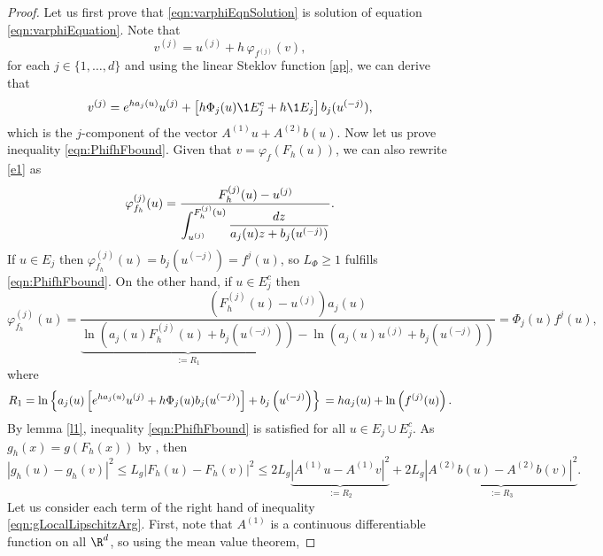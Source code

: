 \begin{proof}
Let us first prove that \eqref{eqn:varphiEqnSolution} is solution 
of equation \eqref{eqn:varphiEquation}.  Note that 
\begin{equation}\label{e1}
v^{(j)} = u^{(j)} + h \,\varphi_{f^{(j)}}(v),	
\end{equation}
for each $j\in \{1,\dots, d\}$ and using the linear Steklov function \eqref{ap}, 
we can derive that
\begin{equation}\label{r1}
v^{(j)}= e^{h a_j(u)} u^{(j)} + 
\left[
h\Phi_j(u)
\1{E_j^c}
+h \1{E_j}
\right]b_{j}(u^{(-j)}),
\end{equation}	
which is the $j$-component of the vector
$A^{(1)}u +A^{(2)} b(u)$. Now let us prove inequality \eqref{eqn:PhifhFbound}. Given that 
$v =\varphi_{f}(F_h(u))$, 
we can also rewrite \eqref{e1} as
$$
\varphi_{f_h}^{(j)}(u) = 
\frac{
	F_h^{(j)}(u)-u^{(j)}
}%
{%
	\displaystyle
	\int_{u^{(j)}}^{F_h^{(j)}(u)}
	\frac{dz}{a_j(u)z + b_j(u^{(-j)})}
}.
$$
If $u\in E_j$ then $\varphi_{f_h}^{(j)}(u) = b_j(u^{(-j)}) = f^{j}(u)$,
so $L_{\Phi}\geq 1$ fulfills  \eqref{eqn:PhifhFbound}.
On the other hand, if $u\in E_j^c$ then
\begin{equation}\label{eqn:VarPhiEjc}
\varphi_{f_h}^{(j)}(u) =
\frac{
	(F_h^{(j)}(u)-u^{(j)}) a_j(u)
}
{
	\underbrace{
		\ln \left(
		a_j(u) F_h^{(j)}(u) + b_j(u^{(-j)})
		\right)
	}_{:=R_1}
	-
	\ln \left(
	a_j(u) u^{(j)} + b_j(u^{(-j)})
	\right)
}=\Phi_j(u)f^j(u),		
\end{equation}
where
\begin{equation}\label{eqn:Ter1Simplification}	
R_1=
\ln\left\{
a_j(u)\left[
e^{ha_j(u)}u^{(j)} +
h\Phi_j(u) b_j(u^{(-j)})	
\right]
+b_j\left(u^{(-j)}\right)
\right\} \notag \\
=h a_j(u) + \ln \left( f^{(j)}(u) \right).		
\end{equation}
By lemma \ref{l1}, inequality \eqref{eqn:PhifhFbound} is satisfied 
for all $u\in E_j \cup E_j^c$. 	As $g_h(x)=g\left(F_h(x) \right)$ 
by , then
\begin{equation} \label{eqn:gLocalLipschitzArg} 
|g_h(u)-g_h(v)|^2 \leq
L_g|F_h(u)- F_h(v)|^2  \leq
2L_g \underbrace{
	|A^{(1)}u - A^{(1)}v|^2 
}_{:=R_2} +
2L_g \underbrace{
	|A^{(2)}b(u) - A^{(2)}b(v) |^2 
}_{:=R_3}.			
\end{equation}
Let us consider each term of the right hand of inequality \eqref{eqn:gLocalLipschitzArg}.
First, note that $A^{(1)}$ is a continuous differentiable function on all 
$\R^d$, so using the mean value theorem,

\end{proof}
